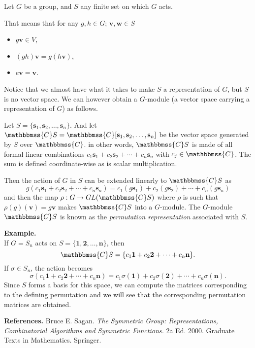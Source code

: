 \documentclass[12pt]{article}
\newcommand{\C}{\mathbbmss{C}}
\newcommand{\vct}[1]{\mathbf{#1}}
\begin{document}
Let $G$ be a group, and $S$ any finite set on which $G$ acts.

That means that for any $g,h\in G$; $\vct{v},\vct{w}\in S$
\begin{itemize}
\item $g\vct{v}\in V$,
\item $(gh)\vct v = g(h\vct v)$,
\item $e\vct v = \vct v$.
\end{itemize}

Notice that we almost have what it takes to make $S$ a representation of $G$, but $S$ is no vector space. We can however obtain a $G$-module (a vector space carrying a representation of $G$) as follows.

Let $S=\{\vct{s}_1,\vct{s}_2,\ldots,\vct{s}_n\}$. And let $\C S = \C[\vct{s}_1,\vct{s}_2,\ldots,\vct{s}_n]$ be the vector space generated by $S$ over $\C$. in other words, $\C S$ is made of all formal linear combinations
$c_1\vct{s}_1+c_2\vct{s}_2+\cdots+c_n\vct{s}_n$ with $c_j\in\C$.
The sum is defined coordinate-wise as is scalar multiplication.

Then the action of $G$ in $S$ can be extended linearly to $\C S$ as
\[
g(c_1\vct{s}_1+c_2\vct{s}_2+\cdots+c_n\vct{s}_n)=
c_1(g\vct{s}_1)+c_2(g\vct{s}_2)+\cdots+c_n(g\vct{s}_n)
\]
and then the map
$\rho : G\to GL(\C S)$ where $\rho$ is such that
$\rho(g)(\vct v) = g\vct v$ makes $\C S$ into a $G$-module. The $G$-module $\C S$ is known as the \emph{permutation representation} associated with $S$.


\textbf{Example.}\\
If $G=S_n$ acts on $S=\{\vct 1,\vct 2,\ldots,\vct n\}$, then
\[
\C S = \{ c_1 \vct{1} + c_2 \vct{2} + \cdots+ c_n\vct n\}.
\]
If $\sigma \in S_n$, the action becomes
\[
\sigma(c_1 \vct{1} + c_2 \vct{2} + \cdots+ c_n\vct n)
=
c_1\sigma(\vct 1)+c_2\sigma(\vct 2) + \cdots + c_n\sigma(\vct n).
\]
Since $S$ forms a basis for this space, we can compute the matrices corresponding to the defining permutation and we will see that the corresponding permutation matrices are obtained.

\bigskip
\textbf{References.}
Bruce E. Sagan. \emph{The Symmetric Group: Representations, Combinatorial Algorithms and Symmetric Functions.}  2a Ed. 2000. Graduate Texts in Mathematics. Springer.
\end{document}
